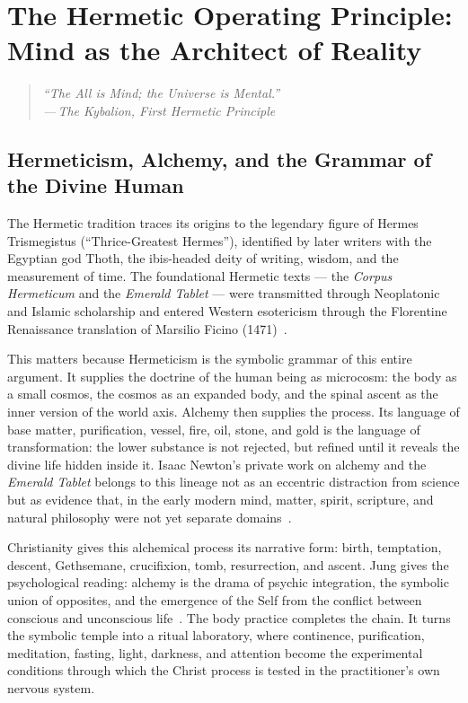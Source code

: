 \documentclass[12pt, a4paper]{article}
\newcommand{\epigraph}[2]{%
  \begin{quote}
    \itshape ``#1''\\[0.3em]
    \normalfont\small\hfill ---\,#2
  \end{quote}
}
\begin{document}
\section{The Hermetic Operating Principle: Mind as the Architect of Reality}
\label{sec:hermeticism}

\epigraph{The All is Mind; the Universe is Mental.}{The Kybalion, First
Hermetic Principle}

\subsection{Hermeticism, Alchemy, and the Grammar of the Divine Human}

The Hermetic tradition traces its origins to the legendary figure of Hermes
Trismegistus (``Thrice-Greatest Hermes''), identified by later writers with
the Egyptian god Thoth, the ibis-headed deity of writing, wisdom, and the
measurement of time. The foundational Hermetic texts — the \emph{Corpus
Hermeticum} and the \emph{Emerald Tablet} — were transmitted through
Neoplatonic and Islamic scholarship and entered Western esotericism through
the Florentine Renaissance translation of Marsilio Ficino
(1471)~\autocite{corpushermeticum}.

This matters because Hermeticism is the symbolic grammar of this entire
argument. It supplies the doctrine of the human being as microcosm: the body as
a small cosmos, the cosmos as an expanded body, and the spinal ascent as the
inner version of the world axis. Alchemy then supplies the process. Its
language of base matter, purification, vessel, fire, oil, stone, and gold is
the language of transformation: the lower substance is not rejected, but
refined until it reveals the divine life hidden inside it. Isaac Newton's
private work on alchemy and the \emph{Emerald Tablet} belongs to this lineage
not as an eccentric distraction from science but as evidence that, in the
early modern mind, matter, spirit, scripture, and natural philosophy were not
yet separate domains~\autocite{dobbs1991}.

Christianity gives this alchemical process its narrative form: birth,
temptation, descent, Gethsemane, crucifixion, tomb, resurrection, and ascent.
Jung gives the psychological reading: alchemy is the drama of psychic
integration, the symbolic union of opposites, and the emergence of the Self
from the conflict between conscious and unconscious life~\autocite{jung1968}.
The body practice completes the chain. It turns the symbolic temple into a
ritual laboratory, where continence, purification, meditation, fasting, light,
darkness, and attention become the experimental conditions through which the
Christ process is tested in the practitioner's own nervous system.
\end{document}
